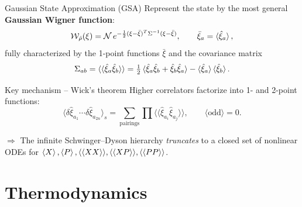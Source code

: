 \documentclass{beamer}
\newcommand{\hl}[1]{{\color{metured}\textbf{#1}}}
\newcommand{\dbk}[1]{\langle\langle #1 \rangle\rangle}
\begin{document}
\begin{frame}{Gaussian State Approximation (GSA)}
  Represent the state by the most general \hl{Gaussian Wigner function}:
  \begin{equation*}
    \mathcal{W}_{\hat\rho}(\xi)=\mathcal{N}\,e^{-\frac{1}{2}(\xi-\bar\xi)^T\Sigma^{-1}(\xi-\bar\xi)},
    \qquad \bar\xi_a=\braket{\hat\xi_a},
  \end{equation*}
  fully characterized by the 1-point functions $\bar\xi$ and the covariance matrix
  \begin{equation*}
    \Sigma_{ab}=\dbk{\hat\xi_a\hat\xi_b}=\tfrac{1}{2}\braket{\hat\xi_a\hat\xi_b+\hat\xi_b\hat\xi_a}-\braket{\hat\xi_a}\braket{\hat\xi_b}.
  \end{equation*}
  \begin{block}{Key mechanism -- Wick's theorem}
    Higher correlators factorize into 1- and 2-point functions:
    \begin{equation*}
      \big\langle \delta\hat\xi_{a_1}\cdots\delta\hat\xi_{a_{2n}}\big\rangle_s
        = \!\!\sum_{\text{pairings}}\prod \dbk{\hat\xi_{a_i}\hat\xi_{a_j}}, \qquad
      \big\langle \text{odd}\big\rangle = 0.
    \end{equation*}
  \end{block}
  $\Rightarrow$ The infinite Schwinger--Dyson hierarchy \emph{truncates} to a closed set of nonlinear ODEs for $\braket{X},\braket{P},\dbk{XX},\dbk{XP},\dbk{PP}$.
\end{frame}

\section{Thermodynamics}
\end{document}
